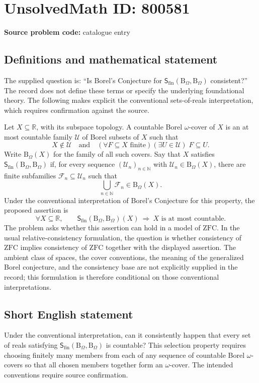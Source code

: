 \documentclass[11pt]{article}
\newcommand{\N}{\mathbb{N}}
\newcommand{\R}{\mathbb{R}}
\begin{document}
\section*{UnsolvedMath ID: 800581}
\textbf{Source problem code:} catalogue entry
\subsection{Definitions and mathematical statement}
The supplied question is: ``Is Borel's Conjecture for $\mathsf{S}_{\mathrm{fin}}(\mathrm{B}_\Omega,\mathrm{B}_\Omega)$ consistent?'' The record does not define these terms or specify the underlying foundational theory. The following makes explicit the conventional sets-of-reals interpretation, which requires confirmation against the source.

Let $X\subseteq\R$, with its subspace topology. A countable Borel $\omega$-cover of $X$ is an at most countable family $\mathcal U$ of Borel subsets of $X$ such that
\[
X\notin\mathcal U
\quad\text{and}\quad
(\forall F\subseteq X\text{ finite})(\exists U\in\mathcal U)\;F\subseteq U.
\]
Write $\mathrm B_\Omega(X)$ for the family of all such covers. Say that $X$ satisfies $\mathsf S_{\mathrm{fin}}(\mathrm B_\Omega,\mathrm B_\Omega)$ if, for every sequence $(\mathcal U_n)_{n\in\N}$ with $\mathcal U_n\in\mathrm B_\Omega(X)$, there are finite subfamilies $\mathcal F_n\subseteq\mathcal U_n$ such that
\[
\bigcup_{n\in\N}\mathcal F_n\in\mathrm B_\Omega(X).
\]
Under the conventional interpretation of Borel's Conjecture for this property, the proposed assertion is
\[
\forall X\subseteq\R,\qquad
\mathsf S_{\mathrm{fin}}(\mathrm B_\Omega,\mathrm B_\Omega)(X)
\ \Longrightarrow\ X\text{ is at most countable}.
\]
The problem asks whether this assertion can hold in a model of $\mathrm{ZFC}$. In the usual relative-consistency formulation, the question is whether consistency of $\mathrm{ZFC}$ implies consistency of $\mathrm{ZFC}$ together with the displayed assertion. The ambient class of spaces, the cover conventions, the meaning of the generalized Borel conjecture, and the consistency base are not explicitly supplied in the record; this formulation is therefore conditional on those conventional interpretations.
\subsection{Short English statement}
Under the conventional interpretation, can it consistently happen that every set of reals satisfying $\mathsf S_{\mathrm{fin}}(\mathrm B_\Omega,\mathrm B_\Omega)$ is countable? This selection property requires choosing finitely many members from each of any sequence of countable Borel $\omega$-covers so that all chosen members together form an $\omega$-cover. The intended conventions require source confirmation.
\end{document}
